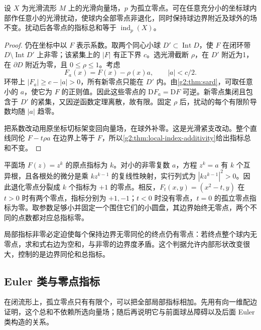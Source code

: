 \begin{proposition}\label{g2:prop:local-transverse-vector-perturbation}
	设 \(X\) 为光滑流形 \(M\) 上的光滑向量场，\(p\) 为孤立零点。可在任意充分小的坐标球内部作任意小的光滑扰动，使球内全部零点非退化，同时保持球边界附近及球外的场不变。扰动后各零点的指标总和等于 \(\operatorname{ind}_p(X)\)。
\end{proposition}
\begin{proof}
	仍在坐标中以 \(F\) 表示系数。取两个同心小球 \(D'\subset\operatorname{Int}D\)，使 \(F\) 在闭环带 \(D\setminus\operatorname{Int}D'\) 上非零；该紧集上的 \(|F|\) 有正下界 \(c\)。选光滑截断 \(\rho\)，在 \(D'\) 附近为1，在 \(\partial D\) 附近为零，且 \(0\le\rho\le1\)。考虑
	\[
		F_a(x)=F(x)-\rho(x)a,\qquad |a|<c/2.
	\]
	环带上 \(|F_a|\ge c-|a|>0\)，所有新零点只能在 \(D'\) 内。由\cref{g2:thm:sard}，可取任意小的 \(a\)，使它为 \(F\) 的正则值。因此这些零点的 \(\mathrm DF_a=\mathrm DF\) 可逆。新零点集闭且包含于 \(D'\) 的紧集，又因逆函数定理离散，故有限。固定 \(\rho\) 后，扰动的每个有限阶导数均随 \(|a|\) 趋零。

	把系数改动用原坐标切标架变回向量场，在球外补零。这是光滑紧支改动。整个直线同伦 \(F-t\rho a\) 在边界上等于 \(F\)，所以\cref{g2:thm:local-index-additivity}给出指标总和不变。
\end{proof}

\begin{example}\label{g2:exm:index-splitting-polynomial}
	平面场 \(F(z)=z^k\) 的原点指标为 \(k\)。对小的非零复数 \(a\)，方程 \(z^k=a\) 有 \(k\) 个互异根，且各根处的微分是乘 \(kz^{k-1}\) 的复线性映射，实行列式为 \(|kz^{k-1}|^2>0\)。因此退化零点分裂成 \(k\) 个指标为 \(+1\) 的零点。相反，\(F_t(x,y)=(x^2-t,y)\) 在 \(t>0\) 时有两个零点，指标分别为 \(+1,-1\)；\(t<0\) 时没有零点，\(t=0\) 的孤立零点指标为零。取参数足够小并固定一个围住它们的小圆盘，其边界始终无零点，两个不同的点数都对应总指标零。
\end{example}

局部指标非零必定迫使每个保持边界无零同伦的终点仍有零点：若终点整个球内无零点，求和式右边为空和，与非零的边界度矛盾。这个判据允许内部形状改变很大，控制的是边界同伦和总指标。

\subsection{Euler 类与零点指标}
\label{g2:subsec:1603:04}

在闭流形上，孤立零点只有有限个，可以把全部局部指标相加。先用有向一维配边证明，这个总和不依赖所选向量场；随后再说明它与前面球丛障碍以及后面 Euler 类构造的关系。

